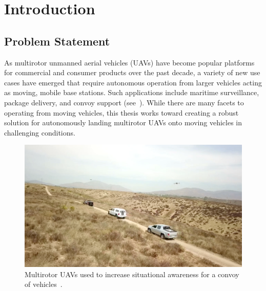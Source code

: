 
\chapter{Introduction}
\label{chp:introduction}

\section{Problem Statement}
As multirotor unmanned aerial vehicles (UAVs) have become popular
platforms for commercial and consumer products over the past decade, a variety
of new use cases have emerged that require autonomous operation from larger
vehicles acting as moving, mobile base stations.
Such applications include
maritime surveillance, package delivery, and convoy
support (see~).
While there are
many facets to operating from moving vehicles, this thesis works toward creating
a robust solution for autonomously landing multirotor UAVs onto moving vehicles
in challenging conditions.


\begin{figure}[htbp]
  \centering
  \includegraphics[width=4.5in]{figures/drone_convoy_support.png}
  \caption[UAV Convoy Support]{Multirotor UAVs used to increase
  situational awareness for a convoy of
vehicles~\cite{ground_vehicle_drone}.}
%
  \label{fig:drone_convoy_support}
\end{figure}


